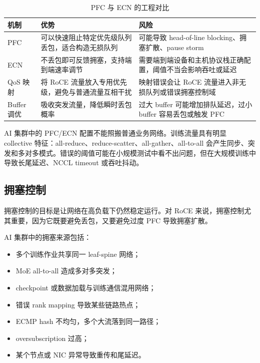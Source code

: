 \begin{table}[H]
  \centering
  \caption{PFC 与 ECN 的工程对比}
  \label{tab:pfc-ecn-comparison}
  \begin{tabular}{p{2.8cm}p{5.0cm}p{5.0cm}}
    \toprule
    机制 & 优势 & 风险 \\
    \midrule
    PFC & 可以快速阻止特定优先级队列丢包，适合构造无损队列 & 可能导致 head-of-line blocking、拥塞扩散、pause storm \\
    ECN & 不丢包即可反馈拥塞，支持端到端速率调节 & 需要端到端设备和主机协议栈正确配置，阈值不当会影响吞吐或延迟 \\
    QoS 映射 & 将 RoCE 流量放入专用优先级，避免与普通流量互相干扰 & 映射错误会让 RoCE 流量进入非无损队列或错误拥塞控制域 \\
    Buffer 调优 & 吸收突发流量，降低瞬时丢包概率 & 过大 buffer 可能增加排队延迟，过小 buffer 容易丢包或触发 PFC \\
    \bottomrule
  \end{tabular}
\end{table}

AI 集群中的 PFC/ECN 配置不能照搬普通业务网络。训练流量具有明显 collective 特征：all-reduce、reduce-scatter、all-gather、all-to-all 会产生同步、突发和多对多模式。错误的阈值可能在小规模测试中看不出问题，但在大规模训练中导致长尾延迟、NCCL timeout 或吞吐抖动。

\subsection{拥塞控制}
\label{subsec:congestion-control}

拥塞控制的目标是让网络在高负载下仍然稳定运行。对 RoCE 来说，拥塞控制尤其重要，因为它既要避免丢包，又要避免过度 PFC 导致拥塞扩散。

AI 集群中的拥塞来源包括：

\begin{itemize}
  \item 多个训练作业共享同一 leaf-spine 网络；
  \item MoE all-to-all 造成多对多突发；
  \item checkpoint 或数据加载与训练通信混用网络；
  \item 错误 rank mapping 导致某些链路热点；
  \item ECMP hash 不均匀，多个大流落到同一路径；
  \item oversubscription 过高；
  \item 某个节点或 NIC 异常导致重传和尾延迟。
\end{itemize}

